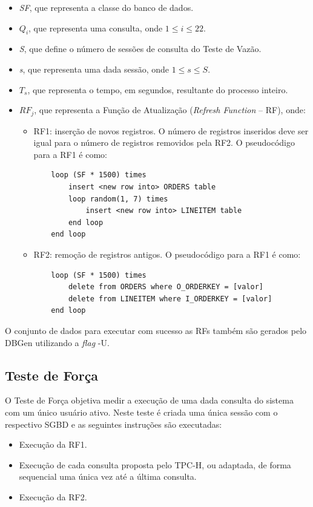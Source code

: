 \begin{itemize}
	\item \textit{SF}, que representa a classe do banco de dados.
	\item \textit{$Q_{i}$}, que representa uma consulta, onde \mbox{$1 \le i \le 22$}.
	\item \textit{S}, que define o número de sessões de consulta do Teste de Vazão.
	\item \textit{s}, que representa uma dada sessão, onde \mbox{$1 \le s \le S$}.
	\item \textit{$T_{s}$}, que representa o tempo, em segundos, resultante do processo inteiro.
	\item \textit{$RF_{j}$}, que representa a Função de Atualização (\textit{Refresh Function} -- RF), onde:
		\begin{itemize}
		    \item RF1: inserção de novos registros. O número de registros inseridos deve ser igual para o número de registros removidos pela RF2. O pseudocódigo para a RF1 é como:
		
\begin{verbatim}
    loop (SF * 1500) times
        insert <new row into> ORDERS table
        loop random(1, 7) times
            insert <new row into> LINEITEM table
        end loop
    end loop
\end{verbatim}
		    \item RF2: remoção de registros antigos. O pseudocódigo para a RF1 é como:
		
\begin{verbatim}
    loop (SF * 1500) times
        delete from ORDERS where O_ORDERKEY = [valor]
        delete from LINEITEM where I_ORDERKEY = [valor]
    end loop
\end{verbatim}
		\end{itemize}
\end{itemize}

O conjunto de dados para executar com sucesso as RFs também são gerados pelo DBGen utilizando a \textit{flag} -U.

\subsection{Teste de Força}
\label{power_test}
O Teste de Força objetiva medir a execução de uma dada consulta do sistema com um único usuário ativo. Neste teste é criada uma única sessão com o respectivo SGBD e as seguintes instruções são executadas:

\begin{itemize}
	\item Execução da RF1.
	\item Execução de cada consulta proposta pelo TPC-H, ou adaptada, de forma sequencial uma única vez até a última consulta.
	\item Execução da RF2.
\end{itemize}

